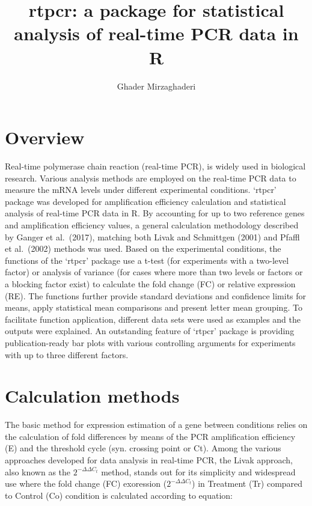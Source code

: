 \documentclass[
]{article}
\title{rtpcr: a package for statistical analysis of real-time PCR data
in R}
\author{Ghader Mirzaghaderi}
\date{}
\begin{document}
\maketitle

{
\setcounter{tocdepth}{2}
\tableofcontents
}
\hypertarget{overview}{%
\section{Overview}\label{overview}}

Real-time polymerase chain reaction (real-time PCR), is widely used in
biological research. Various analysis methods are employed on the
real-time PCR data to measure the mRNA levels under different
experimental conditions. `rtpcr' package was developed for amplification
efficiency calculation and statistical analysis of real-time PCR data in
R. By accounting for up to two reference genes and amplification
efficiency values, a general calculation methodology described by Ganger
et al.~(2017), matching both Livak and Schmittgen (2001) and Pfaffl et
al.~(2002) methods was used. Based on the experimental conditions, the
functions of the `rtpcr' package use a t-test (for experiments with a
two-level factor) or analysis of variance (for cases where more than two
levels or factors or a blocking factor exist) to calculate the fold
change (FC) or relative expression (RE). The functions further provide
standard deviations and confidence limits for means, apply statistical
mean comparisons and present letter mean grouping. To facilitate
function application, different data sets were used as examples and the
outputs were explained. An outstanding feature of `rtpcr' package is
providing publication-ready bar plots with various controlling arguments
for experiments with up to three different factors.

\hypertarget{calculation-methods}{%
\section{Calculation methods}\label{calculation-methods}}

The basic method for expression estimation of a gene between conditions
relies on the calculation of fold differences by means of the PCR
amplification efficiency (E) and the threshold cycle (syn. crossing
point or Ct). Among the various approaches developed for data analysis
in real-time PCR, the Livak approach, also known as the
\(2^{-\Delta\Delta C_t}\) method, stands out for its simplicity and
widespread use where the fold change (FC) exoression
(\(2^{-\Delta\Delta C_t}\)) in Treatment (Tr) compared to Control (Co)
condition is calculated according to equation:
\end{document}
